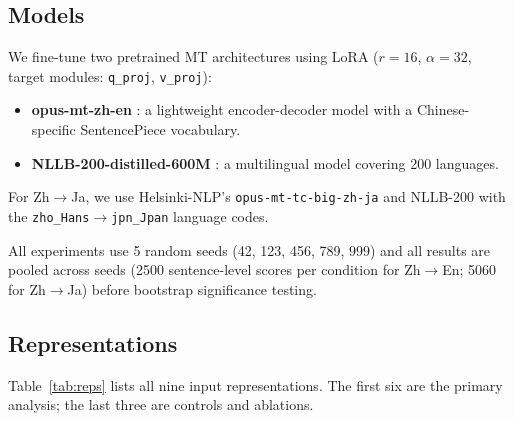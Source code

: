 \documentclass[11pt]{article}
\begin{document}
\subsection{Models}

We fine-tune two pretrained MT architectures using LoRA ($r=16$, $\alpha=32$, target modules: \texttt{q\_proj}, \texttt{v\_proj}):
\begin{itemize}
\item \textbf{opus-mt-zh-en} \citep{tiedemann-thottingal-2020-opus}: a lightweight encoder-decoder model with a Chinese-specific SentencePiece vocabulary.
\item \textbf{NLLB-200-distilled-600M} \citep{costa-jussa-etal-2022-no}: a multilingual model covering 200 languages.
\end{itemize}

For Zh$\to$Ja, we use Helsinki-NLP's \mbox{\texttt{opus-mt-tc-big-zh-ja}} and NLLB-200 with the \texttt{zho\_Hans}$\to$\texttt{jpn\_Jpan} language codes.

All experiments use 5 random seeds (42, 123, 456, 789, 999) and all results are pooled across seeds (2500 sentence-level scores per condition for Zh$\to$En; 5060 for Zh$\to$Ja) before bootstrap significance testing.

\subsection{Representations}

Table~\ref{tab:reps} lists all nine input representations. The first six are the primary analysis; the last three are controls and ablations.
\end{document}

